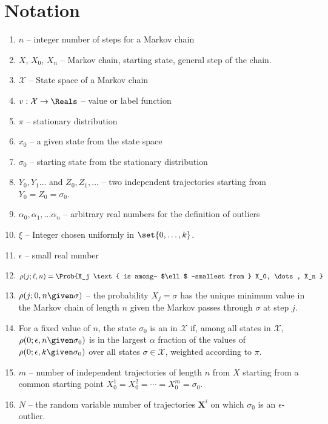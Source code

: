 \documentclass[12pt]{article}
\begin{document}
\section*{Notation}
\begin{enumerate}
\item \( n \) -- integer number of steps for a Markov chain
    \item
        \( X \), \( X_0 \), \( X_n \) -- Markov chain, starting state,
        general step of the chain.
    \item
        \( \mathcal{X} \) -- State space of a Markov chain
    \item
        \( v :  \mathcal{X} \to \Reals \) -- value or label function
    \item
        \( \pi \) -- stationary distribution
    \item
        \( x_0 \) -- a given state from the state space
      \item $\sigma_0$ -- starting state from the stationary
        distribution
      \item
            \( Y_0 , Y_1 \dots \) and \(
            Z_0, Z_1, \dots \) -- two independent trajectories  starting from \( Y_0 = Z_0 = \sigma_0 \).

    \item
        \( \alpha_0, \alpha_1, \dots \alpha_n \) -- arbitrary real
        numbers for the definition of outliers
      \item   \( \xi \) -- Integer chosen uniformly in \( \set{0,\dots, k}
            \).

    \item
        \( \epsilon \) -- small real number
    \item
        \[
            \rho(j; \ell, n) = \Prob{X_j \text{ is among- $\ell$
            -smallest from } X_0, \dots, X_n }
        \]
    \item
        \( \rho(j; 0, n \given \sigma) \) -- the probability \( X_j =
        \sigma \) has the unique minimum value in the Markov chain of
        length \( n \) given the Markov passes through \( \sigma \) at
        step \( j \).
      \item     For a fixed value of \( n \), the state \( \sigma_0 \) is an  in \( \mathcal{X} \) if, among all
    states in \( \mathcal{X} \), \( \rho(0; \epsilon, n \given \sigma_{0})
    \) is in the largest \( \alpha \) fraction of the values of \( \rho(0;
    \epsilon, k \given \sigma_{0}) \) over all states \( \sigma \in
    \mathcal{X} \), weighted according to \( \pi \).
  \item \( m \) -- number of independent trajectories of length \( n \) from \(
            X \) starting from a common starting point \( X_0^1 =
            X_0^2 = \cdots = X_0^m = \sigma_0 \). 
          \item \( N \) -- the random variable
            number of trajectories \( \mathbf{X}^i \) on which \( \sigma_0
            \) is an \( \epsilon \)-outlier.
\end{enumerate}
\end{document}

